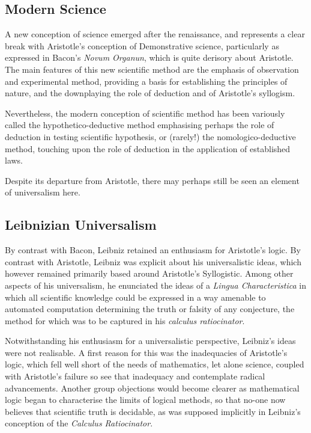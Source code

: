 \subsection{Modern Science}

A new conception of science emerged after the renaissance, and represents a clear break with Aristotle's conception of Demonstrative science, particularly as expressed in Bacon's \emph{Novum Organun}\cite{bacon1620}, which is quite derisory about Aristotle.
The main features of this new scientific method are the emphasis of observation and experimental method, providing a basis for establishing the principles of nature, and the downplaying the role of deduction and of Aristotle's syllogism.

Nevertheless, the modern conception of scientific method has been variously called the hypothetico-deductive method emphasising perhaps the role of deduction in testing scientific hypothesis, or (rarely!) the nomologico-deductive method, touching upon the role of deduction in the application of established laws.

Despite its departure from Aristotle, there may perhaps still be seen an element of universalism here.

\subsection{Leibnizian Universalism}

By contrast with Bacon, Leibniz retained an enthusiasm for Aristotle's logic.
By contrast with Aristotle, Leibniz was explicit about his universalistic ideas, which however remained primarily based around Aristotle's Syllogistic.
Among other aspects of his universalism, he enunciated the ideas of a \emph{Lingua Characteristica} in which all scientific knowledge could be expressed in a way amenable to automated computation determining the truth or falsity of any conjecture, the method for which was to be captured in his \emph{calculus ratiocinator}\cite{couturat1901,peckhaus2004,lenzen2018}.

Notwithstanding his enthusiasm for a universalistic perspective, Leibniz's ideas were not realisable.
A first reason for this was the inadequacies of Aristotle's logic, which fell well short of the needs of mathematics, let alone science, coupled with Aristotle's failure so see that inadequacy and contemplate radical advancements.
Another group objections would become clearer as mathematical logic began to characterise the limits of logical methods, so that no-one now believes that scientific truth is decidable, as was supposed implicitly in Leibniz's conception of the \emph{Calculus Ratiocinator}.

